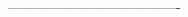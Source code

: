 \documentclass[a0,portrait]{a0poster}
\begin{document}
\begin{mdframed}[style=MyFrame]
\begin{multicols}{2}

%
%




-------------------------------------
\end{multicols}

\end{mdframed}
\end{document}
